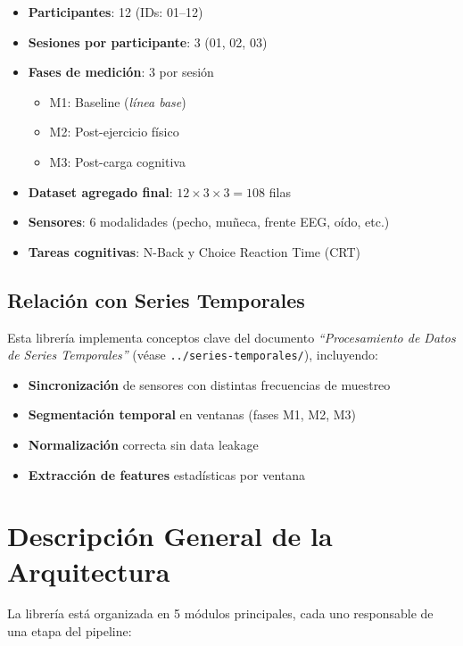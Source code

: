 \documentclass[12pt,a4paper]{article}
\begin{document}
\begin{itemize}
    \item \textbf{Participantes}: 12 (IDs: 01--12)
    \item \textbf{Sesiones por participante}: 3 (01, 02, 03)
    \item \textbf{Fases de medición}: 3 por sesión
        \begin{itemize}
            \item M1: Baseline (\textit{línea base})
            \item M2: Post-ejercicio físico
            \item M3: Post-carga cognitiva
        \end{itemize}
    \item \textbf{Dataset agregado final}: $12 \times 3 \times 3 = 108$ filas
    \item \textbf{Sensores}: 6 modalidades (pecho, muñeca, frente EEG, oído, etc.)
    \item \textbf{Tareas cognitivas}: N-Back y Choice Reaction Time (CRT)
\end{itemize}

\subsection{Relación con Series Temporales}

Esta librería implementa conceptos clave del documento \textit{``Procesamiento de Datos de Series Temporales''} (véase \texttt{../series-temporales/}), incluyendo:
\begin{itemize}
    \item \textbf{Sincronización} de sensores con distintas frecuencias de muestreo
    \item \textbf{Segmentación temporal} en ventanas (fases M1, M2, M3)
    \item \textbf{Normalización} correcta sin data leakage
    \item \textbf{Extracción de features} estadísticas por ventana
\end{itemize}

\section{Descripción General de la Arquitectura}

La librería está organizada en 5 módulos principales, cada uno responsable de una etapa del pipeline:
\end{document}
